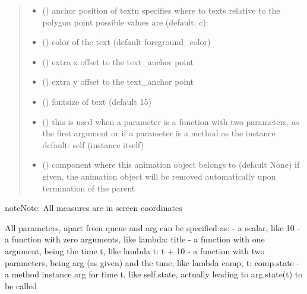 \documentclass[letterpaper,10pt,english]{sphinxmanual}
\begin{document}
\begin{fulllineitems}
\begin{quote}
\begin{description}
\begin{itemize}
\item {} 
 () \textendash{} anchor position of text\textbar{}n\textbar{}
specifies where to texts relative to the polygon
point 
possible values are (default: c): 

\item {} 
 () \textendash{} color of the text (default foreground\_color)

\item {} 
 () \textendash{} extra x offset to the text\_anchor point

\item {} 
 () \textendash{} extra y offset to the text\_anchor point

\item {} 
 () \textendash{} fontsize of text (default 15)

\item {} 
 () \textendash{} this is used when a parameter is a function with two parameters, as the first argument or
if a parameter is a method as the instance 
default: self (instance itself)

\item {} 
 ({\hyperref[\detokenize{Reference:salabim.Component}]{}}) \textendash{} component where this animation object belongs to (default None) 
if given, the animation object will be removed
automatically upon termination of the parent

\end{itemize}

\end{description}\end{quote}

\begin{sphinxadmonition}{note}{Note:}
All measures are in screen coordinates 

All parameters, apart from queue and arg can be specified as: 
- a scalar, like 10 
- a function with zero arguments, like lambda: title 
- a function with one argument, being the time t, like lambda t: t + 10 
- a function with two parameters, being arg (as given) and the time, like lambda comp, t: comp.state 
- a method instance arg for time t, like self.state, actually leading to arg.state(t) to be called
\end{sphinxadmonition}

\end{fulllineitems}
\end{document}
